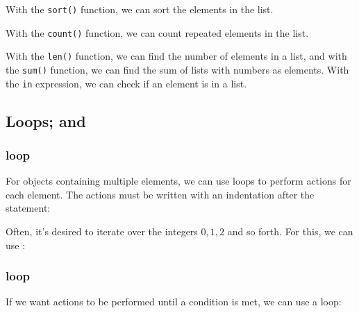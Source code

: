  \vsk

With the \texttt{sort()} function, we can sort the elements in the list.
\vsk

\newpage
With the \texttt{count()} function, we can count repeated elements in the list.
 \vsk

With the \texttt{len()} function, we can find the number of elements in a list, and with the \texttt{sum()} function, we can find the sum of lists with numbers as elements.
\newpage
With the \texttt{in} expression, we can check if an element is in a list.

\newpage
\subsection{Loops;  and }
\subsubsection{ loop}
For objects containing multiple elements, we can use  loops to perform actions for each element. The actions must be written with an indentation after the  statement:
\vsk

Often, it's desired to iterate over the integers $0, 1, 2$ and so forth. For this, we can use :
\subsubsection{ loop}
If we want actions to be performed until a condition is met, we can use a  loop: \regv
{}

